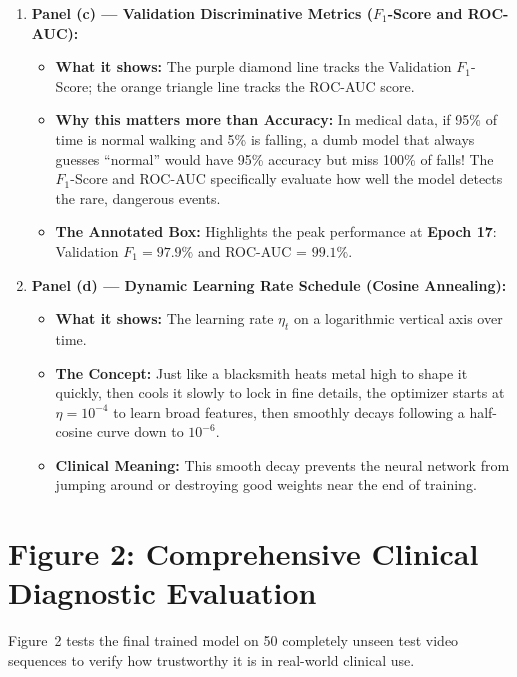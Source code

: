 \documentclass[11pt,a4paper]{article}
\begin{document}
\begin{enumerate}
    \item \textbf{Panel (c) --- Validation Discriminative Metrics ($F_1$-Score and ROC-AUC):}
    \begin{itemize}
        \item \textbf{What it shows:} The purple diamond line tracks the Validation $F_1$-Score; the orange triangle line tracks the ROC-AUC score.
        \item \textbf{Why this matters more than Accuracy:} In medical data, if 95\% of time is normal walking and 5\% is falling, a dumb model that always guesses ``normal'' would have 95\% accuracy but miss 100\% of falls! The $F_1$-Score and ROC-AUC specifically evaluate how well the model detects the rare, dangerous events.
        \item \textbf{The Annotated Box:} Highlights the peak performance at \textbf{Epoch 17}: Validation $F_1 = \mathbf{97.9\%}$ and ROC-AUC = $\mathbf{99.1\%}$.
    \end{itemize}

    \item \textbf{Panel (d) --- Dynamic Learning Rate Schedule (Cosine Annealing):}
    \begin{itemize}
        \item \textbf{What it shows:} The learning rate $\eta_t$ on a logarithmic vertical axis over time.
        \item \textbf{The Concept:} Just like a blacksmith heats metal high to shape it quickly, then cools it slowly to lock in fine details, the optimizer starts at $\eta = 10^{-4}$ to learn broad features, then smoothly decays following a half-cosine curve down to $10^{-6}$.
        \item \textbf{Clinical Meaning:} This smooth decay prevents the neural network from jumping around or destroying good weights near the end of training.
    \end{itemize}
\end{enumerate}

\newpage

\section{Figure 2: Comprehensive Clinical Diagnostic Evaluation}

Figure~2 tests the final trained model on 50 completely unseen test video sequences to verify how trustworthy it is in real-world clinical use.
\end{document}
